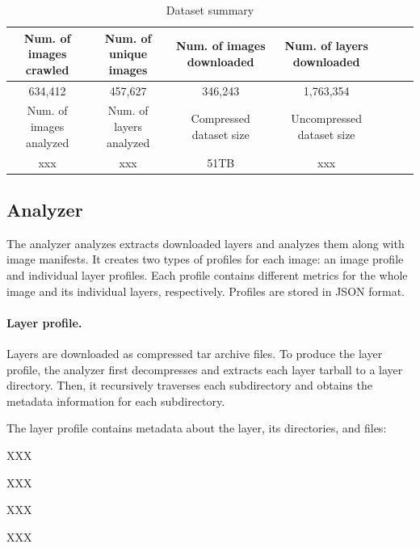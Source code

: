 \begin{table}
	\centering
	\caption{Dataset summary} \label{tab-dataset-summary}
	\begin{tabular}{c|c|c|c|c|c|c}%
		\hline
		Num. of images crawled & Num. of unique images    & Num. of images downloaded  & Num. of layers downloaded \\
		\hline
		634,412                 & 457,627                 & 346,243                    & 1,763,354  \\
		\hline
		Num. of images analyzed & Num. of layers analyzed & Compressed dataset size              &  Uncompressed dataset size \\
		\hline
		xxx                     & xxx                     & 51TB                        & xxx  \\
		\hline
	\end{tabular}
\end{table}

\subsection{Analyzer}
\label{sec:analyzer}

The analyzer analyzes extracts downloaded layers
and analyzes them along with image manifests.
It creates two types of profiles for each image:
an image profile and individual layer profiles.
Each profile contains different metrics for the whole image and
its individual layers, respectively.
Profiles are stored in JSON format.


%
%

\paragraph{Layer profile.}

Layers are downloaded as compressed tar archive files.
%
To produce the layer profile, the analyzer first decompresses and extracts each
layer tarball to a layer directory.
%
Then, it recursively traverses each subdirectory and obtains
the metadata information for each subdirectory.

The layer profile contains metadata about the layer, its directories,
and files: 
\begin{compactitemize}
	\item XXX
	\item XXX
	\item XXX
	\item XXX
\end{compactitemize}

